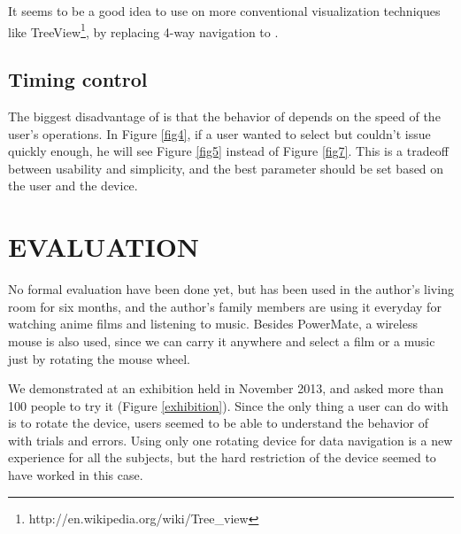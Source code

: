 \documentclass{article}
\begin{document}

It seems to be a good idea to use {\ST} on more conventional visualization techniques like
TreeView\footnote{
  \textsf{http://en.wikipedia.org/wiki/Tree\_view}
}, by replacing 4-way navigation to {\ST}.


\subsection{Timing control}

The biggest disadvantage of {\ST} is that
the behavior of {\ST} depends on the speed of the user's operations.
In Figure \ref{fig4},
if a user wanted to select  but couldn't issue {\D}
quickly enough, he will see Figure \ref{fig5} instead of Figure \ref{fig7}.
This is a tradeoff between usability and simplicity, and
the best parameter should be set based on the user and the {\ST} device.

\section*{EVALUATION}

No formal evaluation have been done yet, but {\ST} has been used in the author's
living room for six months, and the author's family members are using it
everyday for watching anime films and listening to music.
Besides PowerMate, a wireless mouse is also used,
since we can carry it anywhere and select
a film or a music just by rotating the mouse wheel.

We demonstrated {\ST} at an exhibition
held in November 2013, and asked more than 100 people to try it
(Figure \ref{exhibition}).
%
Since the only thing a user can do with {\ST} is to rotate the device,
users seemed to be able to understand the behavior of {\ST} with trials and errors.
% 
% 
Using only one rotating device for data navigation is a new experience for
all the subjects, but the hard restriction of the device seemed to have worked in this case.
\end{document}
